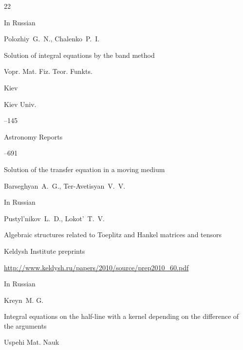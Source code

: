 \begin{thebibliography}{22}

\lang In Russian

\by Polozhiy~G.~N., Chalenko~P.~I.

\paper Solution of integral equations by the band method

\inbook Vopr. Mat. Fiz. Teor. Funkts. 

\publaddr Kiev

\publ Kiev Univ.


--145






\jour Astronomy Reports




--691

\paper Solution of the transfer equation in a moving medium

\by Barseghyan~A.~G., Ter-Avetisyan~V.~V.







\lang In Russian

\by Pustyl'nikov~L.~D., Lokot'~T.~V.

\paper Algebraic structures related to Toeplitz and Hankel matrices and tensors

\jour Keldysh Institute preprints




\elink \url{http://www.keldysh.ru/papers/2010/source/prep2010_60.pdf}




\lang In Russian

\by Kreyn~M. G.

\paper

Integral equations on the half-line with a kernel depending on the difference of the arguments

\jour Uspehi Mat. Nauk




\end{thebibliography}
